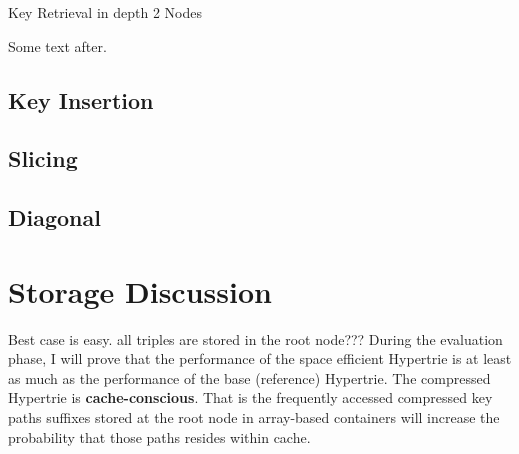 \begin{algorithm}
	\DontPrintSemicolon
	\SetAlgoLined
	 \;
	\caption{\sc Key Retrieval in depth 2 Nodes}
	\label{algo:key_retrieval_depth2}
	
\end{algorithm}


Some text after. \\

\subsection{Key Insertion} 

\subsection{Slicing} 

\subsection{Diagonal}

\section{Storage Discussion}

Best case is easy. all triples are stored in the root node???
During the evaluation phase, I will prove that the performance of the space efficient Hypertrie is at least as much as the performance of the base (reference) Hypertrie. 
The compressed Hypertrie is \textbf{cache-conscious}. 
That is the frequently accessed compressed key paths suffixes stored at the root node in array-based containers will increase the probability that those paths resides within cache. 

